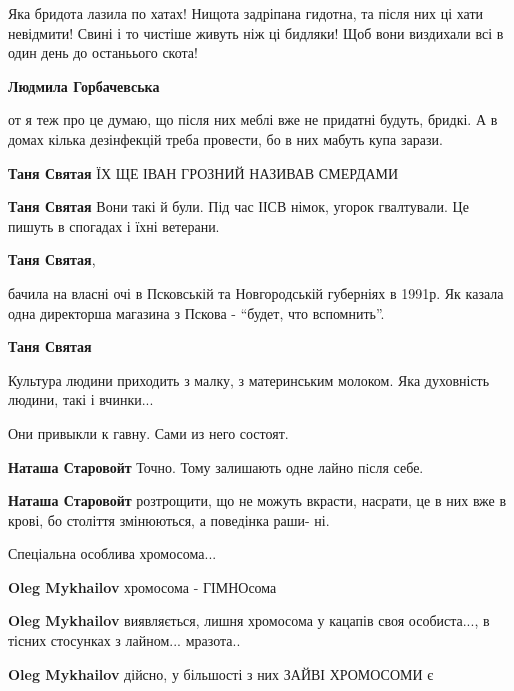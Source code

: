 \begin{itemize}
\begin{itemize}

Яка бридота лазила по хатах! Нищота задріпана гидотна, та після них ці хати
невідмити! Свині і то чистіше живуть ніж ці бидляки! Щоб вони виздихали всі в
один день до останьього скота!

\textbf{Людмила Горбачевська} 

от я теж про це думаю, що після них меблі вже не придатні будуть, бридкі. А в
домах кілька дезінфекцій треба провести, бо в них мабуть купа зарази.

\textbf{Таня Святая} ЇХ ЩЕ ІВАН ГРОЗНИЙ НАЗИВАВ СМЕРДАМИ

\textbf{Таня Святая} Вони такі й були. Під час ІІСВ німок, угорок гвалтували. Це пишуть в спогадах і їхні ветерани.

\textbf{Таня Святая}, 

бачила на власні очі в Псковській та Новгородській губерніях в 1991р. Як казала
одна директорша магазина з Пскова - \enquote{будет, что вспомнить}.

\textbf{Таня Святая} 

Культура людини приходить з малку, з материнським молоком. Яка духовність
людини, такі і вчинки...

\end{itemize} %


Они привыкли к гавну. Сами из него состоят.

\begin{itemize} %
\textbf{Наташа Старовойт} Точно. Тому залишають одне лайно пiсля себе.

\textbf{Наташа Старовойт} розтрощити, що не можуть вкрасти, насрати, це в них вже в крові, бо століття змінюються, а поведінка раши- ні.
\end{itemize} %

Спеціальна особлива хромосома...

\begin{itemize} %
\textbf{Oleg Mykhailov} хромосома - ГІМНОсома

\textbf{Oleg Mykhailov} виявляється, лишня хромосома у кацапів своя особиста..., в тісних стосунках з лайном... мразота..

\textbf{Oleg Mykhailov} дійсно, у більшості з них ЗАЙВІ ХРОМОСОМИ є
\end{itemize} %


\end{itemize}
